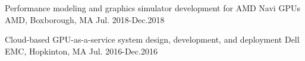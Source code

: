 \begin{cventries}

  \vspace{0.1cm}

  \cventry
  {Performance modeling and graphics simulator development for AMD Navi GPUs}
  {AMD, }
  {Boxborough, MA}
  {Jul. 2018-Dec.2018}
  {
  }
  \vspace{-0.5cm}

  \cventry
  {Cloud-based GPU-as-a-service system design, development, and deployment}
  {Dell EMC, }
  {Hopkinton, MA}
  {Jul. 2016-Dec.2016}
  {
  }
  \vspace{-0.5cm}
\end{cventries}
